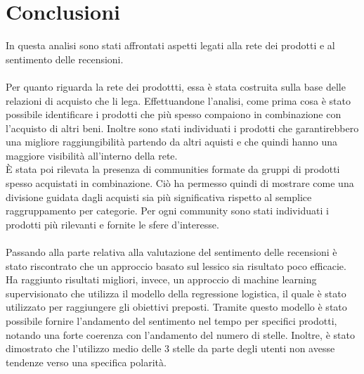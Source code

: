 \section{Conclusioni}\label{Conclusioni}
In questa analisi sono stati affrontati aspetti legati alla rete dei prodotti e al sentimento delle recensioni. 
\\\\
Per quanto riguarda la rete dei prodottti, essa è stata costruita sulla base delle relazioni di acquisto che li lega. Effettuandone l'analisi, come prima cosa è stato possibile identificare i prodotti che più spesso compaiono in combinazione con l'acquisto di altri beni. Inoltre sono stati individuati i prodotti che garantirebbero una migliore raggiungibilità partendo da altri aquisti e che quindi hanno una maggiore visibilità all'interno della rete. \\
È stata poi rilevata la presenza di communities formate da gruppi di prodotti spesso acquistati in combinazione. Ciò ha permesso quindi di mostrare come una divisione guidata dagli acquisti sia più significativa rispetto al semplice raggruppamento per categorie. Per ogni community sono stati individuati i prodotti più rilevanti e fornite le sfere d'interesse. 
\\\\
Passando alla parte relativa alla valutazione del sentimento delle recensioni è stato riscontrato che un approccio basato sul lessico sia risultato poco efficacie. Ha raggiunto risultati migliori, invece, un approccio di machine learning supervisionato che utilizza il modello della regressione logistica, il quale è stato utilizzato per raggiungere gli obiettivi preposti. Tramite questo modello è stato possibile fornire l'andamento del sentimento nel tempo per specifici prodotti, notando una forte coerenza con l'andamento del numero di stelle. Inoltre, è stato dimostrato che l'utilizzo medio delle 3 stelle da parte degli utenti non avesse tendenze verso una specifica polarità. 
\\\\

